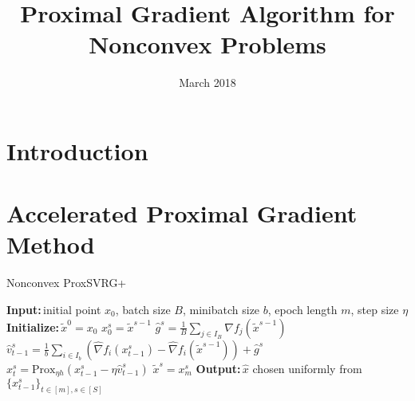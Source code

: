 \documentclass{article}
\title{Proximal Gradient Algorithm for Nonconvex Problems}
\date{March 2018}
\newcommand*{\Po}{\text{Prox}}
\newcommand{\Initialize}{\textbf{Initialize:}{\,}}
\newcommand{\Input}{\textbf{Input:}{\,}}
\newcommand{\Output}{\textbf{Output:}{\,}}
\theoremstyle{definition}
\theoremstyle{remark}
\begin{document}
\maketitle

\section{Introduction}


\section{Accelerated Proximal Gradient Method}

\begin{algorithm}\label{APGnonconvex-Algo}
\caption{Nonconvex ProxSVRG+}
\begin{algorithmic}[1]
\State\Input initial point $x_0$, batch size $B$, minibatch size $b$, epoch length $m$, step size $\eta$
\State\Initialize $\tilde{x}^0 = x_0$
\State $x_0^s = \widetilde{x}^{s-1}$
\State $\hat{g}^s = \frac{1}{B} \sum_{j\in I_B} \nabla f_j (\widetilde{x}^{s-1})$
\State ${\hat{v}}_{t-1}^s = \frac{1}{b} \sum_{i\in I_b}\left(\hat{\nabla} f_{i}(x_{t-1}^s)-\hat{\nabla} f_{i}(\tilde{x}^{s-1})\right)+\hat{g}^s$
\State $x_{t}^s= \Po_{\eta h}(x_{t-1}^s - \eta \hat{v}_{t-1}^s)$
\EndFor
\State $\widetilde{x}^{s} = x_m^s$
 \EndFor
 \State\Output $\hat{x}$ chosen uniformly from $\{x_{t-1}^s\}_{t\in [m], s\in [S]}$
\end{algorithmic}
\end{algorithm}
\end{document}
